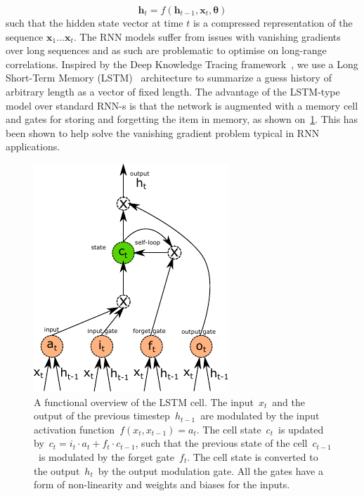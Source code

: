 \begin{equation}
\mathbf{h}_t = f(\mathbf{h}_{t-1}, \mathbf{x}_t, \mathbf{\theta})
\end{equation}
such that the hidden state vector at time $t$ is a compressed representation of the sequence $\mathbf{x}_1 \dots \mathbf{x}_t$. 
The RNN models suffer from issues with vanishing gradients over long sequences and as such are problematic to optimise on long-range correlations. Inspired by the Deep Knowledge Tracing framework~\cite{DBLP:journals/corr/PiechSHGSGS15}, we use a Long Short-Term Memory (LSTM)~\cite{gers1999learning} architecture to summarize a guess history of arbitrary length as a vector of fixed length. The advantage of the LSTM-type model over standard RNN-s is that the network is augmented with a memory cell and gates for storing and forgetting the item in memory, as shown on~\cref{fig:lstm_cell}. This has been shown to help solve the vanishing gradient problem typical in RNN applications. 


\begin{figure}
\centering
\includegraphics[width=0.6\linewidth]{figures/lingvist/lstm.pdf}
\caption[The long short-term memory cell]{A functional overview of the LSTM cell. The input~$x_t$~and the output of the previous timestep~$h_{t-1}$~are modulated by the input activation function~$f(x_t, x_{t-1}) = a_t$. The cell state~$c_t$~is updated by~$c_t = i_t \cdot a_t + f_t \cdot c_{t-1}$, such that the previous state of the cell~$c_{t-1}$~is modulated by the forget gate~$f_t$. The cell state is converted to the output~$h_t$~by the output modulation gate. All the gates have a form of non-linearity and weights and biases for the inputs.}
\label{fig:lstm_cell}
\end{figure} 

